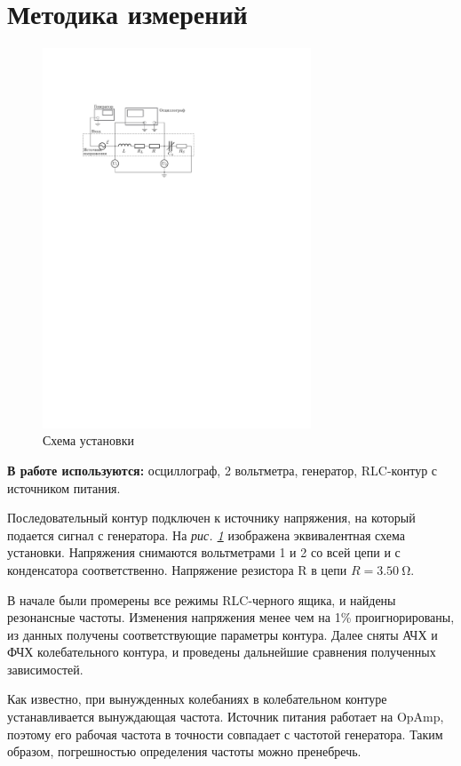 \documentclass[12pt, a4paper]{article}
\begin{document}
\section{Методика измерений}
\begin{figure} \centering \vspace{-8mm}
  \includegraphics[width=8cm]{setup.pdf}
  \caption{Схема установки}
  \label{setup}
\end{figure}


\textbf{В работе используются:} осциллограф, 2 вольтметра, генератор, RLC-контур с источником питания.

Последовательный контур подключен к источнику напряжения, на который подается сигнал с генератора. На \textit{рис. \ref{setup}} изображена эквивалентная схема установки. Напряжения снимаются вольтметрами 1 и 2 со всей цепи и с конденсатора соответственно. Напряжение резистора R в цепи $R = 3.50~\mathrm{\Omega}$.

В начале были промерены все режимы RLC-черного ящика, и найдены резонансные частоты. Изменения напряжения менее чем на 1\% проигнорированы, из данных получены соответствующие параметры контура. Далее сняты АЧХ и ФЧХ колебательного контура, и проведены дальнейшие сравнения полученных зависимостей.

Как известно, при вынужденных колебаниях в колебательном контуре устанавливается вынуждающая частота. Источник питания работает на OpAmp, поэтому его рабочая частота в точности совпадает с частотой генератора. Таким образом, погрешностью определения частоты можно пренебречь.
\end{document}
